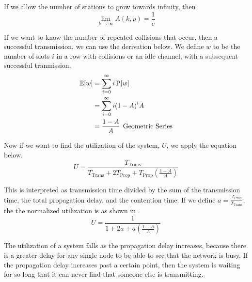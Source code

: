 If we allow the number of stations to grow towards infinity, then
\begin{equation}\label{eq:CSMACD_Performance_Infinity}
  \lim\limits_{k \rightarrow \infty} A(k, p) = \frac{1}{e}
\end{equation}

If we want to know the number of repeated collisions that occur, then a successful transmission, we can use the derivation below.
We define $w$ to be the number of slots $i$ in a row with collisions or an idle channel, with a subsequent successful tranmission.
\begin{align*}
  \operatorname{\operatorname{\mathbb{E}}}[w] &= \sum\limits_{i=0}^{\infty} i \operatorname{\operatorname{P}}[w] \\
                    &= \sum\limits_{i=0}^{\infty} i {(1-A)}^{i}A \\
                    &= \frac{1-A}{A} \:\: \text{Geometric Series}
\end{align*}

Now if we want to find the utilization of the system, $U$, we apply the equation below.
\begin{equation}\label{eq:Utilization}
  U = \frac{T_{\mathrm{Trans}}}{T_{\mathrm{Trans}} + 2T_{\mathrm{Prop}} + T_{\mathrm{Prop}}\left( \frac{1-A}{A} \right)}
\end{equation}

This is interpreted as transmission time divided by the sum of the transmission time, the total propagation delay, and the contention time.
If we define $a = \frac{T_{\mathrm{Prop}}}{T_{\mathrm{Trans}}}$, the the normalized utilization is as shown in .
\begin{equation}\label{eq:CSMACD_Normalized_Utilization}
  U = \frac{1}{1 + 2a + a \left( \frac{1-A}{A} \right)}
\end{equation}

\begin{remark*}
  The utilization of a  system falls as the propagation delay increases, because there is a greater delay for any single node to be able to see that the network is busy.
  If the propagation delay increases past a certain point, then the system is waiting for so long that it can never find that someone else is transmitting.
\end{remark*}

